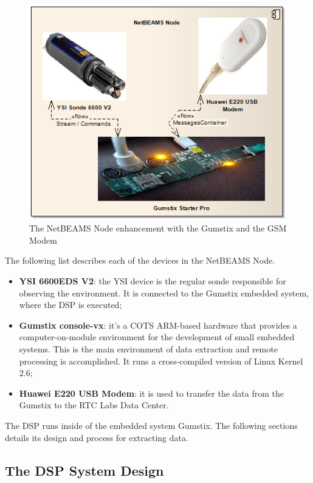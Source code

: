 \begin{figure}[h]
  \centering
  \includegraphics[scale=0.5]{../diagrams/DSP-Gateway-Node}
  \caption{The NetBEAMS Node enhancement with the Gumstix and the GSM Modem}
  \label{fig:sf-netbeams-node}
\end{figure}

The following list describes each of the devices in the NetBEAMS Node.

\begin{itemize}
  \item \textbf{YSI 6600EDS V2}: the YSI device is the regular sonde
  responsible for observing the environment. It is connected to the Gumstix
  embedded system, where the DSP is executed;
  \item \textbf{Gumstix console-vx}: it's a COTS ARM-based hardware that
  provides a computer-on-module environment for the development of small
  embedded systems. This is the main environment of data extraction and remote
  processing is accomplished. It runs a cross-compiled version of Linux Kernel
  2.6;
  \item \textbf{Huawei E220 USB Modem}: it is used to transfer the data from the
  Gumstix to the RTC Labs Data Center.
\end{itemize} 

The DSP runs inside of the embedded system Gumstix. The following sections
details its design and process for extracting data.

\subsection{The DSP System Design}

